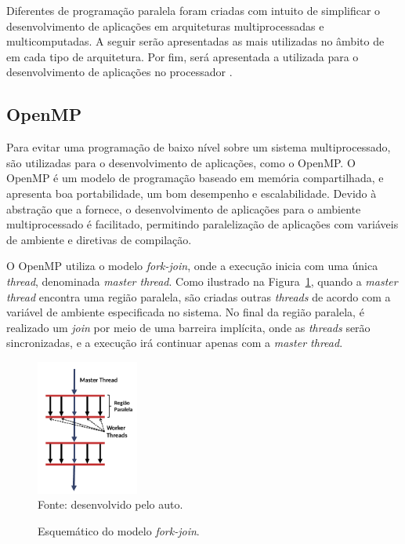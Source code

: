 Diferentes \apis de programação paralela foram criadas com intuito de simplificar
o desenvolvimento de aplicações em arquiteturas multiprocessadas e multicomputadas.
A seguir serão apresentadas as \apis mais utilizadas no âmbito de \hpc em cada tipo de
arquitetura. Por fim, será apresentada a \api utilizada para o desenvolvimento de aplicações
no processador \mppa.


\subsection{OpenMP}

%


Para evitar uma programação de baixo nível sobre um sistema multiprocessado, são
utilizadas \apis para o desenvolvimento de aplicações, como o OpenMP. O OpenMP
é um modelo de programação baseado em memória compartilhada, e apresenta boa
portabilidade, um bom desempenho e escalabilidade. Devido à abstração que a \api
fornece, o desenvolvimento de aplicações para o ambiente multiprocessado é
facilitado, permitindo paralelização de aplicações com variáveis de ambiente e
diretivas de compilação.

O OpenMP utiliza o modelo \textit{fork-join}, onde a execução inicia com uma
única \textit{thread}, denominada \textit{master thread}. Como ilustrado na
Figura~\ref{fig:forkjoin}, quando a \textit{master thread} encontra
uma região paralela, são criadas outras \textit{threads} de acordo com a variável
de ambiente especificada no sistema. No final da região paralela, é realizado um
\textit{join} por meio de uma barreira implícita, onde as \textit{threads} serão
sincronizadas, e a execução irá continuar apenas com a \textit{master thread}.

\begin{figure}[t]
	\centering
	\caption{Esquemático do modelo \textit{fork-join}.}
	\includegraphics[width=0.3\textwidth]{figs/forkjoin.pdf} \\
    Fonte: desenvolvido pelo auto.
	\label{fig:forkjoin}
\end{figure}

